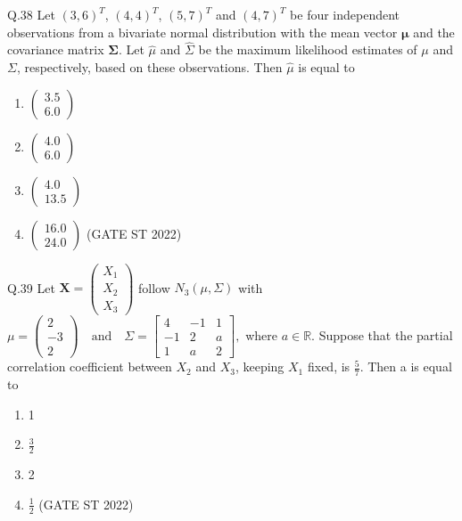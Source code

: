 \documentclass[journal,12pt,onecolumn]{IEEEtran}
\theoremstyle{remark}
\begin{document}
	\vspace{2em}
Q.38 Let ${(3,6)}^T$, ${(4,4)}^T$, ${(5,7)}^T$ and ${(4,7)}^T$ be four independent observations from a bivariate normal distribution with the mean vector $\mathbf{\mu}$ and the covariance matrix $\mathbf{\Sigma}$. Let $\hat{\mu}$ and $\hat{\Sigma}$ be the maximum likelihood estimates of $\mu$ and $\Sigma$, respectively, based on these observations. Then $\hat{\mu}$ is equal to 
\begin{enumerate}[label=\Alph*.] 
	\item $\begin{pmatrix} 3.5\\ 6.0 \end{pmatrix}$
	\item $\begin{pmatrix} 4.0\\ 6.0 \end{pmatrix}$
	\item $\begin{pmatrix} 4.0\\ 13.5 \end{pmatrix}$
	\item $\begin{pmatrix} 16.0\\ 24.0 \end{pmatrix}$
	\hfill (GATE ST 2022)
\end{enumerate}
	\vspace{2em}
Q.39 Let 
$
\mathbf{X} = \begin{pmatrix} X_1 \\ X_2 \\ X_3 \end{pmatrix}
$
follow 
$
N_3(\mu, \Sigma)
$
with 
$
\mu = \begin{pmatrix} 2 \\ -3 \\ 2 \end{pmatrix}
\quad \text{and} \quad
\Sigma = \begin{bmatrix}
	4 & -1 & 1 \\
	-1 & 2 & a \\
	1 & a & 2
\end{bmatrix},
$
where \(a \in \mathbb{R}\). Suppose that the partial correlation coefficient between \(X_2\) and \(X_3\), keeping \(X_1\) fixed, is \(\frac{5}{7}\). Then a is equal to
\begin{enumerate}[label=\Alph*.] 
	\item 1
	\item $\frac{3}{2}$
	\item 2
	\item $\frac{1}{2}$
	\hfill (GATE ST 2022)
\end{enumerate}
\end{document}
